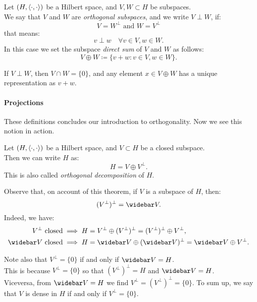 \begin{defn}
	Let $(H, \left\langle\cdot, \cdot\right\rangle)$ be a Hilbert space, and $V,W \subset H$ be subspaces.\\
	We say that $V$ and $W$ are \emph{orthogonal subspaces}, and we write $V \perp W$, if:
	$$V = W^\perp \text{ and } W = V^\perp$$
	that means:
	$$v \perp w \quad \forall v \in V, w \in W.$$
	In this case we set the subspace \emph{direct sum} of $V$ and $W$ as follows:
	$$ V \oplus W \coloneqq \{v+w : v \in V, w \in W \}.$$ 
\end{defn}

\begin{prop}
	If $V \perp W$, then $V \cap W=\{0\}$,
	and any element $x \in V \oplus W$ has a unique representation as $v+w$.
\end{prop}

\paragraph{Projections} These definitions concludes our introduction to orthogonality. Now we see this notion in action.

\begin{theo}\label{theo-projection}
	Let $(H, \left\langle\cdot, \cdot\right\rangle)$ be a Hilbert space, and $V \subset H$ be a closed subspace.\\
	Then we can write $H$ as:
	$$H= V \oplus V^\perp.$$
	This is also called \emph{orthogonal decomposition} of $H$.
\end{theo}

Observe that, on account of this theorem, if $V$ is a subspace of $H$, then: 
$$( V^\perp )^\perp = \widebar V.$$
Indeed, we have:
\begin{align*}
	V^\perp \ \text{closed} &\implies H = V^\perp \oplus ( V^\perp )^\perp = ( V^\perp )^\perp \oplus V^\perp,\\
	\widebar V \ \text{closed} &\implies H = \widebar V \oplus ( \widebar V )^\perp = \widebar V \oplus V^\perp.
\end{align*}

Note also that $V^\perp =\{0\}$ if and only if $\widebar V = H$.\\
This is because $V^\perp = \{0\}$ so that $(V^\perp)^\perp = H$ and $\widebar V = H$.\\
Viceversa, from $\widebar V = H$ we find $V ^\perp = ( V^\perp )^\perp = \{0\}$. To sum up, we say that $V$ is dense in $H$ if and only if $V^\perp = \{0\}$.

